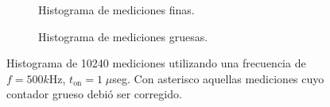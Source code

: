 \begin{figure}[H]
     \centering
     \begin{subfigure}[t]{0.45\textwidth} %
           \centering
           \caption{Histograma de mediciones finas.}
           \label{fig: histograma_66}
     \end{subfigure}%
     \hspace{10pt}%
     \begin{subfigure}[t]{0.4\textwidth} %
           \centering
           \caption{Histograma de mediciones gruesas.}
     \end{subfigure}
     \caption{Histograma de 10240 mediciones utilizando una frecuencia de $f=500k$Hz, $t_{\text{on}}=1 \; \mu$seg. 
     Con asterisco aquellas mediciones cuyo contador grueso debió ser corregido.}
\end{figure}

